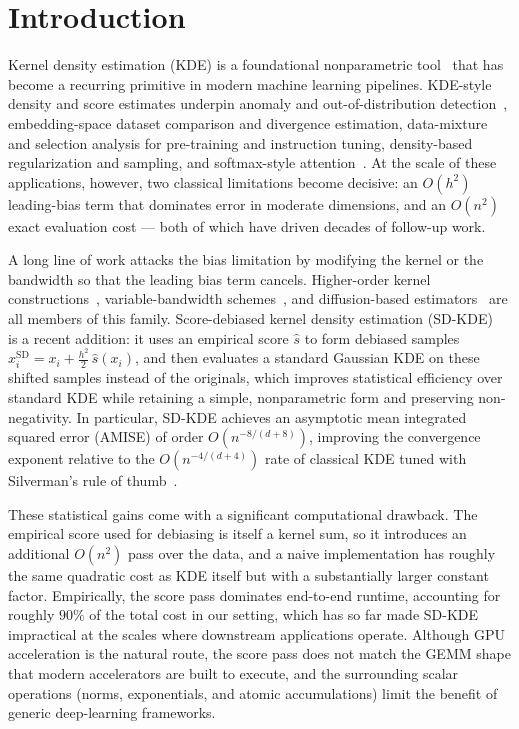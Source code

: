 \section{Introduction}
Kernel density estimation (KDE) is a foundational nonparametric tool~\citep{rosenblatt1956remarks,parzen1962estimation,silverman1986density,wand1995kernel} that has become a recurring primitive in modern machine learning pipelines. KDE-style density and score estimates underpin anomaly and out-of-distribution detection~\citep{luo2018ace,coleman2020race}, embedding-space dataset comparison and divergence estimation, data-mixture and selection analysis for pre-training and instruction tuning, density-based regularization and sampling, and softmax-style attention~\citep{zandieh2023kdeformer,kacham2024polysketchformer}. At the scale of these applications, however, two classical limitations become decisive: an $O(h^2)$ leading-bias term that dominates error in moderate dimensions, and an $O(n^2)$ exact evaluation cost --- both of which have driven decades of follow-up work.

A long line of work attacks the bias limitation by modifying the kernel or the bandwidth so that the leading bias term cancels. Higher-order kernel constructions~\citep{fan1992bias,jones1997comparison}, variable-bandwidth schemes~\citep{abramson1982bandwidth}, and diffusion-based estimators~\citep{botev2010diffusion} are all members of this family. Score-debiased kernel density estimation (SD-KDE)~\citep{epstein2025sdkde} is a recent addition: it uses an empirical score $\hat s$ to form debiased samples $x_i^{\mathrm{SD}} = x_i + \tfrac{h^2}{2}\,\hat s(x_i)$, and then evaluates a standard Gaussian KDE on these shifted samples instead of the originals, which improves statistical efficiency over standard KDE while retaining a simple, nonparametric form and preserving non-negativity. In particular, SD-KDE achieves an asymptotic mean integrated squared error (AMISE) of order $O(n^{-8/(d+8)})$, improving the convergence exponent relative to the $O(n^{-4/(d+4)})$ rate of classical KDE tuned with Silverman's rule of thumb~\citep{silverman1986density,wand1995kernel}.

These statistical gains come with a significant computational drawback. The empirical score used for debiasing is itself a kernel sum, so it introduces an additional $O(n^2)$ pass over the data, and a naive implementation has roughly the same quadratic cost as KDE itself but with a substantially larger constant factor. Empirically, the score pass dominates end-to-end runtime, accounting for roughly $90\%$ of the total cost in our setting, which has so far made SD-KDE impractical at the scales where downstream applications operate. Although GPU acceleration is the natural route, the score pass does not match the GEMM shape that modern accelerators are built to execute, and the surrounding scalar operations (norms, exponentials, and atomic accumulations) limit the benefit of generic deep-learning frameworks.

